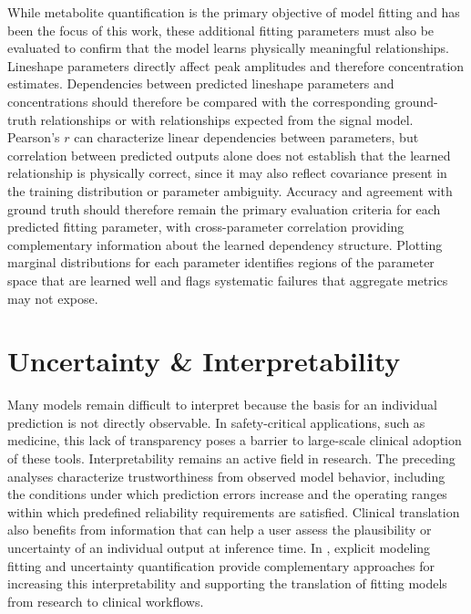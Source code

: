 While metabolite quantification is the primary objective of model fitting and has been the focus of this work, these additional fitting parameters must also be evaluated to confirm that the model learns physically meaningful relationships. Lineshape parameters directly affect peak amplitudes and therefore concentration estimates. Dependencies between predicted lineshape parameters and concentrations should therefore be compared with the corresponding ground-truth relationships or with relationships expected from the signal model. Pearson's $r$ can characterize linear dependencies between parameters, but correlation between predicted outputs alone does not establish that the learned relationship is physically correct, since it may also reflect covariance present in the training distribution or parameter ambiguity. Accuracy and agreement with ground truth should therefore remain the primary evaluation criteria for each predicted fitting parameter, with cross-parameter correlation providing complementary information about the learned dependency structure. Plotting marginal distributions for each parameter identifies regions of the parameter space that are learned well and flags systematic failures that aggregate metrics may not expose.

\section{Uncertainty \& Interpretability}
\label{sec:Interpretability}
Many \DL models remain difficult to interpret because the basis for an individual prediction is not directly observable. In safety-critical applications, such as medicine, this lack of transparency poses a barrier to large-scale clinical adoption of these tools. Interpretability remains an active field in \AI research. The preceding analyses characterize trustworthiness from observed model behavior, including the conditions under which prediction errors increase and the operating ranges within which predefined reliability requirements are satisfied. Clinical translation also benefits from information that can help a user assess the plausibility or uncertainty of an individual output at inference time. In \MRS, explicit modeling fitting and uncertainty quantification provide complementary approaches for increasing this interpretability and supporting the translation of \DL fitting models from research to clinical workflows.

